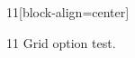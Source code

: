 \documentclass[paper=A4]{ropas-poster}
\begin{document}
\begin{postergrid}{1}{1}[block-align=center]
\begin{posterblock}{1}{1}
Grid option test.
\end{posterblock}
\end{postergrid}
\end{document}
